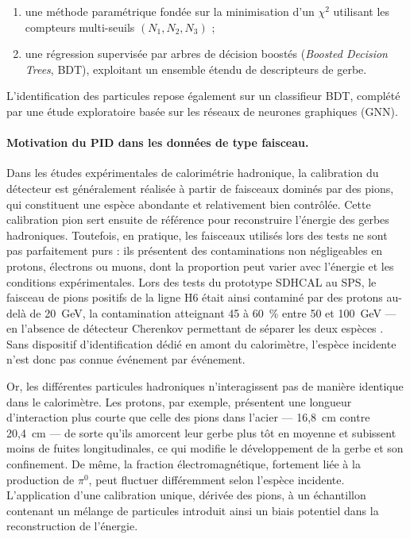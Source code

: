 \begin{enumerate}[label=(\roman*)]
    \item une méthode paramétrique fondée sur la minimisation d’un \(\chi^2\) utilisant les compteurs multi-seuils \((N_1, N_2, N_3)\) ;
    \item une régression supervisée par arbres de décision boostés (\emph{Boosted Decision Trees}, BDT), exploitant un ensemble étendu de descripteurs de gerbe.
\end{enumerate}

L’identification des particules repose également sur un classifieur BDT, complété par une étude exploratoire basée sur les réseaux de neurones graphiques (GNN).

\paragraph{Motivation du PID dans les données de type faisceau.}

Dans les études expérimentales de calorimétrie hadronique, la calibration du détecteur est généralement réalisée à partir de faisceaux dominés par des pions, qui constituent une espèce abondante et relativement bien contrôlée. Cette calibration pion sert ensuite de référence pour reconstruire l’énergie des gerbes hadroniques. Toutefois, en pratique, les faisceaux utilisés lors des tests ne sont pas parfaitement purs : ils présentent des contaminations non négligeables en protons, électrons ou muons, dont la proportion peut varier avec l’énergie et les conditions expérimentales. Lors des tests du prototype SDHCAL au SPS, le faisceau de pions positifs de la ligne H6 était ainsi contaminé par des protons au-delà de 20~GeV, la contamination atteignant 45 à 60~\% entre 50 et 100~GeV — en l’absence de détecteur Cherenkov permettant de séparer les deux espèces \cite{calice2016sdhcal}. Sans dispositif d’identification dédié en amont du calorimètre, l’espèce incidente n’est donc pas connue événement par événement.

Or, les différentes particules hadroniques n’interagissent pas de manière identique dans le calorimètre. Les protons, par exemple, présentent une longueur d’interaction plus courte que celle des pions dans l’acier — 16,8~cm contre 20,4~cm \cite{calice2016sdhcal} — de sorte qu’ils amorcent leur gerbe plus tôt en moyenne et subissent moins de fuites longitudinales, ce qui modifie le développement de la gerbe et son confinement. De même, la fraction électromagnétique, fortement liée à la production de $\pi^0$, peut fluctuer différemment selon l’espèce incidente. L’application d’une calibration unique, dérivée des pions, à un échantillon contenant un mélange de particules introduit ainsi un biais potentiel dans la reconstruction de l’énergie.

